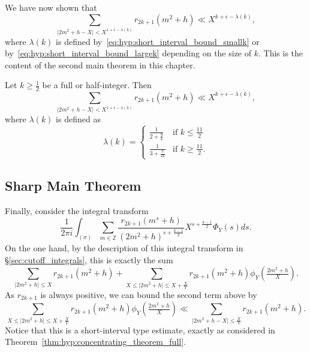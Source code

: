 We have now shown that
\begin{equation}
  \sum_{\lvert 2m^2 + h - X \rvert < X^{1 + \epsilon - \lambda(k)}} r_{2k+1}(m^2 + h) \ll
  X^{k + \epsilon - \lambda(k)},
\end{equation}
where $\lambda(k)$ is defined by~\eqref{eq:hyp:short_interval_bound_smallk} or
by~\eqref{eq:hyp:short_interval_bound_largek} depending on the size of $k$.
This is the content of the second main theorem in this chapter.
\begin{theorem}\label{thm:hyp:concentrating_theorem_full}
  Let $k \geq \frac{1}{2}$ be a full or half-integer.
  Then
  \begin{equation}
    \sum_{\lvert 2m^2 + h - X \rvert < X^{1 + \epsilon - \lambda(k)}} r_{2k+1}(m^2 + h)
    \ll X^{k + \epsilon - \lambda(k)},
  \end{equation}
  where $\lambda(k)$ is defined as
  \begin{equation}
    \lambda(k) =
    \begin{cases}
      \frac{1}{2 + \frac{9}{k}} & \text{if } k \leq \frac{11}{2} \\
      \frac{1}{3 + \frac{7}{2k}} & \text{if } k \geq \frac{11}{2}.
    \end{cases}
  \end{equation}
\end{theorem}



\subsection{Sharp Main Theorem}


Finally, consider the integral transform
\begin{equation}
  \frac{1}{2\pi i} \int_{(\sigma)} \sum_{m \in \mathbb{Z}} \frac{r_{2k+1}{(m^s +
  h)}}{(2m^2 + h)^{s + \frac{k-1}{2}}} X^{s + \frac{k-1}{2}} \Phi_Y(s) ds.
\end{equation}
On the one hand, by the description of this integral transform in
\S\ref{sec:cutoff_integrals}, this is exactly the sum
\begin{equation}\label{eq:hyp:sharp_main_estimate_I}
  \sum_{\lvert 2m^2 + h \rvert \leq X} r_{2k+1}(m^2 + h) + \sum_{X \leq \lvert 2m^2+h
  \rvert \leq X+\frac{X}{Y}} r_{2k+1}(m^2+h) \phi_Y(\tfrac{2m^2+h}{X}).
\end{equation}
As $r_{2k+1}$ is always positive, we can bound the second term above by
\begin{equation}\label{eq:hyp:sharp_main_estimate_II}
  \sum_{X \leq \lvert 2m^2+h \rvert \leq X+\frac{X}{Y}} r_{2k+1}(m^2+h)
  \phi_Y(\tfrac{2m^2+h}{X}) \ll \sum_{\lvert 2m^2 + h - X \rvert \leq \frac{X}{Y}}
  r_{2k+1}(m^2 + h).
\end{equation}
Notice that this is a short-interval type estimate, exactly as considered in
Theorem~\ref{thm:hyp:concentrating_theorem_full}.


